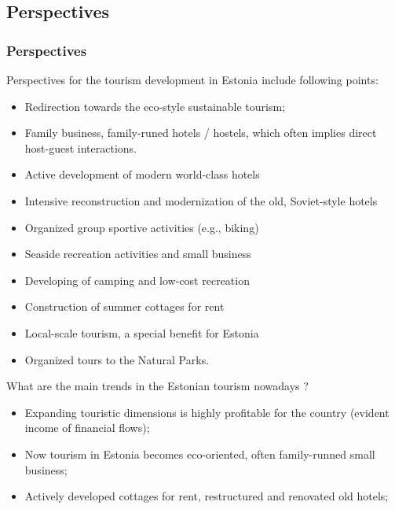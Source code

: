 \documentclass[pdflatex,compress,8pt,
	xcolor={dvipsnames,dvipsnames,svgnames,x11names,table},
	hyperref={	
	breaklinks = true, 
	pdfauthor={Lemenkova Polina}, 
	pdfsubject={Preentation}, 
	pdfcreator={Lemenkova Polina}, 
	pdfproducer={Lemenkova Polina}, 
	colorlinks=true,
	linkcolor=Tomato, 
	citecolor=DeepPink3, 
	urlcolor = NavyBlue, 
	breaklinks = true}]{beamer}
\begin{document}
\subsection{Perspectives}
\begin{frame}\frametitle{Perspectives}
\vspace{3em}
 Perspectives for the tourism development in Estonia include following points:
\begin{itemize}
	\item Redirection towards the eco-style sustainable tourism;
	\item Family business, family-runed hotels / hostels, which often implies direct host-guest interactions.
	\item Active development of modern world-class hotels
	\item Intensive reconstruction and modernization of the old, Soviet-style hotels
	\item Organized group sportive activities (e.g., biking)
	\item Seaside recreation activities and small business
	\item Developing of camping and low-cost recreation
	\item Construction of summer cottages for rent
	\item Local-scale tourism, a special benefit for Estonia
	\item Organized tours to the Natural Parks.
\end{itemize}
What are the main trends in the Estonian tourism nowadays ?
\begin{itemize}
	\item Expanding touristic dimensions is highly profitable for the country (evident income of financial flows);
	\item Now tourism in Estonia becomes eco-oriented, often family-runned small business;
	\item Actively developed cottages for rent, restructured and renovated old hotels;
\end{itemize}
\end{frame}
\end{document}
